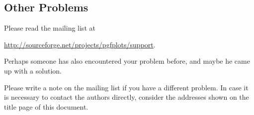 \subsection{Other Problems}
Please read the mailing list at

\url{http://sourceforge.net/projects/pgfplots/support}.

\noindent Perhaps someone has also encountered your problem before, and maybe he came up with a solution.

Please write a note on the mailing list if you have a different problem. In case it is necessary to contact the authors directly, consider the addresses shown on the title page of this document.
